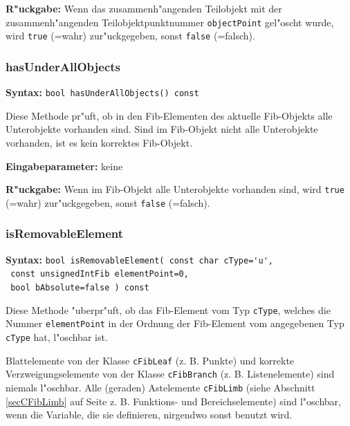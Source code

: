 \bigskip\noindent
\textbf{R"uckgabe:} Wenn das zusammenh"angenden Teilobjekt mit der zusammenh"angenden Teilobjektpunktnummer \verb|objectPoint| gel"oscht wurde, wird \verb|true| (=wahr) zur"uckgegeben, sonst \verb|false| (=falsch).


\subsubsection{hasUnderAllObjects}

\textbf{Syntax:} \verb|bool hasUnderAllObjects() const|

\bigskip\noindent
Diese Methode pr"uft, ob in den Fib-Elementen des aktuelle Fib-Objekts alle Unterobjekte vorhanden sind. Sind im Fib-Objekt nicht alle Unterobjekte vorhanden, ist es kein korrektes Fib-Objekt.

\bigskip\noindent
\textbf{Eingabeparameter:} keine

\bigskip\noindent
\textbf{R"uckgabe:} Wenn im Fib-Objekt alle Unterobjekte vorhanden sind, wird \verb|true| (=wahr) zur"uckgegeben, sonst \verb|false| (=falsch).


\subsubsection{isRemovableElement}
\label{secIsRemovableElement}

\textbf{Syntax:} \verb|bool isRemovableElement( const char cType='u', | \\\verb| const unsignedIntFib elementPoint=0,| \\\verb| bool bAbsolute=false ) const|

\bigskip\noindent
Diese Methode "uberpr"uft, ob das Fib-Element vom Typ \verb|cType|, welches die Nummer \verb|elementPoint| in der Ordnung der Fib-Element vom angegebenen Typ \verb|cType| hat, l"oschbar ist.

Blattelemente von der Klasse \verb|cFibLeaf| (z. B. Punkte) und korrekte Verzweigungselemente von der Klasse \verb|cFibBranch| (z. B. Listenelemente) sind niemals l"oschbar. Alle (geraden) Astelemente \verb|cFibLimb| (siehe Abschnitt \ref{secCFibLimb} auf Seite \pageref{secCFibLimb} z. B. Funktions- und Bereichselemente) sind l"oschbar, wenn die Variable, die sie definieren, nirgendwo sonst benutzt wird.

